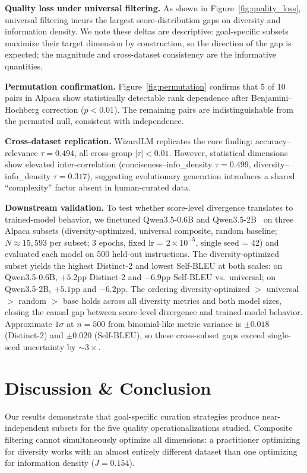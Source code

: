 \documentclass[11pt,a4paper]{article}
\begin{document}
\textbf{Quality loss under universal filtering.}
As shown in Figure~\ref{fig:quality_loss}, universal filtering incurs the largest score-distribution gaps on diversity and information density.
We note these deltas are descriptive: goal-specific subsets maximize their target dimension by construction, so the direction of the gap is expected; the magnitude and cross-dataset consistency are the informative quantities.

\textbf{Permutation confirmation.}
Figure~\ref{fig:permutation} confirms that 5 of 10 pairs in Alpaca show statistically detectable rank dependence after Benjamini--Hochberg correction ($p < 0.01$).
The remaining pairs are indistinguishable from the permuted null, consistent with independence.

\textbf{Cross-dataset replication.}
WizardLM replicates the core finding: accuracy--relevance $\tau = 0.494$, all cross-group $|\tau| < 0.01$.
However, statistical dimensions show elevated inter-correlation (conciseness--info\_density $\tau = 0.499$, diversity--info\_density $\tau = 0.317$), suggesting evolutionary generation introduces a shared ``complexity'' factor absent in human-curated data.

\textbf{Downstream validation.}
To test whether score-level divergence translates to trained-model behavior, we finetuned Qwen3.5-0.6B and Qwen3.5-2B~\cite{qwen2025qwen3} on three Alpaca subsets (diversity-optimized, universal composite, random baseline; $N \approx 15{,}593$ per subset; 3 epochs, fixed lr = $2 \times 10^{-5}$, single seed = 42) and evaluated each model on 500 held-out instructions.
The diversity-optimized subset yields the highest Distinct-2 and lowest Self-BLEU at both scales: on Qwen3.5-0.6B, $+5.2$pp Distinct-2 and $-6.9$pp Self-BLEU vs.\ universal; on Qwen3.5-2B, $+5.1$pp and $-6.2$pp.
The ordering diversity-optimized $>$ universal $>$ random $>$ base holds across all diversity metrics and both model sizes, closing the causal gap between score-level divergence and trained-model behavior.
Approximate $1\sigma$ at $n=500$ from binomial-like metric variance is $\pm 0.018$ (Distinct-2) and $\pm 0.020$ (Self-BLEU), so these cross-subset gaps exceed single-seed uncertainty by $\sim 3\times$.

\section{Discussion \& Conclusion}

Our results demonstrate that goal-specific curation strategies produce near-independent subsets for the five quality operationalizations studied.
Composite filtering cannot simultaneously optimize all dimensions: a practitioner optimizing for diversity works with an almost entirely different dataset than one optimizing for information density ($J = 0.154$).
\end{document}
